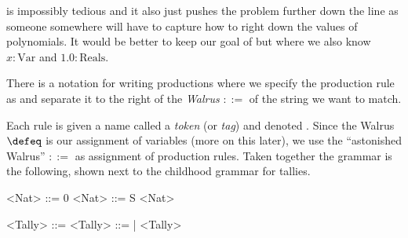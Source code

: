 is impossibly tedious and it also just 
pushes the problem further down the line as someone somewhere will have 
to capture how to right down the values of polynomials.  It would be 
better to keep 
our goal of but where we also know 
$x:\text{Var}$ and $1.0:\text{Reals}$.

There is a notation for writing productions where we 
specify the production rule as  and separate it to the right 
of the \emph{Walrus} $::=$ of the string we want to match.
\begin{center}
    
\end{center}

Each rule is given a name called
a \emph{token} (or \emph{tag}) and denoted . Since the Walrus
$\defeq$ is our assignment of variables (more on this later), we use the
``astonished Walrus'' $::=$ as assignment of production rules.   Taken together
the grammar is the following, shown next to the childhood grammar for tallies.
\begin{center}
\begin{minipage}{0.4\textwidth}
\begin{Gcode}[]
<Nat> ::= 0 
<Nat> ::= S <Nat>
\end{Gcode}
\end{minipage}
\hfill
\begin{minipage}{0.45\textwidth}
\begin{Gcode}[]
<Tally> ::=  
<Tally> ::= | <Tally>
\end{Gcode}
\end{minipage}
\end{center}